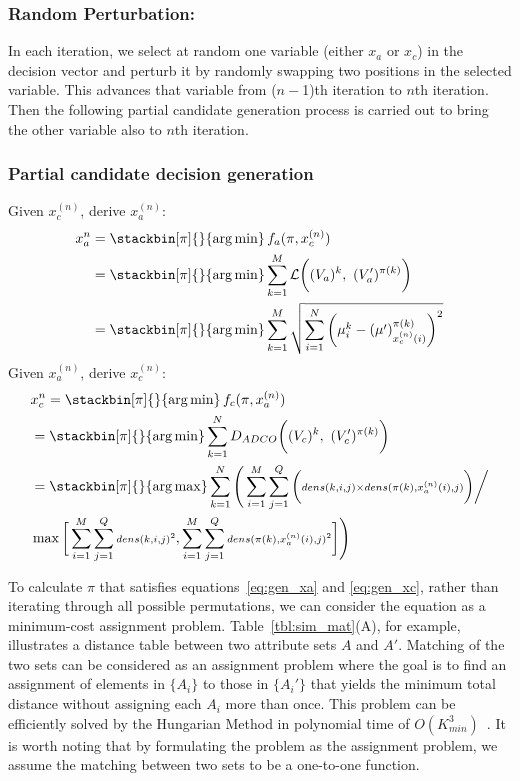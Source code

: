 \subsubsection{Random Perturbation:} In each iteration, we select at random one variable (either $x_a$ or $x_c$) in the decision vector and perturb it by randomly swapping two positions in the selected variable. This advances that variable from ($n-$1)th iteration to $n$th iteration. Then the following partial candidate generation process is carried out to bring the other variable also to $n$th iteration.
\subsubsection{Partial candidate decision generation}
\label{sec:new_sols}
Given $x_c^{(n)}$, derive $x_a^{(n)}$:
\begin{align}
\notag x_a^n&=\stackbin[\pi]{}{\argmin}\,f_a(\pi,x_c^{(n)})\\
\notag &=\stackbin[\pi]{}{\argmin}\sum_{k=1}^M\mathcal{L}\bigg((V_a)^k,~(V_a')^{\pi(k)}\bigg)\\
&=\stackbin[\pi]{}{\argmin}\sum_{k=1}^M\sqrt{\sum_{i=1}^N\bigg(\mu^{k}_i-(\mu')^{\pi(k)}_{x_c^{(n)}(i)}\bigg)^2} \label{eq:gen_xa}
\end{align}
Given $x_a^{(n)}$, derive $x_c^{(n)}$:
\begin{align}
\notag &x_c^n=\stackbin[\pi]{}{\argmin}\,f_c(\pi,x_a^{(n)})\\
\notag &=\stackbin[\pi]{}{\argmin}\sum_{k=1}^N D_{ADCO}\bigg((V_c)^k,~(V_c')^{\pi(k)}\bigg)\\
\notag &=\stackbin[\pi]{}{\argmax}\sum_{k=1}^N\Bigg(\displaystyle \sum_{i=1}^M\sum_{j=1}^Q \bigg({\scriptstyle dens(k,i,j)\times dens(\pi(k),x_a^{(n)}(i),j)}\bigg) \bigg/\\
&\max{\bigg[\sum_{i=1}^M\sum_{j=1}^Q {\scriptstyle dens(k,i,j)^2},\sum_{i=1}^M\sum_{j=1}^Q {\scriptstyle dens(\pi(k),x_a^{(n)}(i),j)^2}\bigg]}\Bigg) \label{eq:gen_xc}
\end{align}

To calculate $\pi$ that satisfies equations~\ref{eq:gen_xa} and \ref{eq:gen_xc}, rather than iterating through all possible permutations, we can consider the equation as a minimum-cost assignment problem. Table~\ref{tbl:sim_mat}(A), for example, illustrates a distance table between two attribute sets $A$ and $A'$. Matching of the two sets can be considered as an assignment problem where the goal is to find an assignment of elements in $\{A_i\}$ to those in $\{A_i'\}$ that yields the minimum total distance without assigning each $A_i$ more than once. This problem can be efficiently solved by the Hungarian Method in polynomial time of $O(K_{min}^3)$~\cite{Kuhn1955}. It is worth noting that by formulating the problem as the assignment problem, we assume the matching between two sets to be a one-to-one function.


